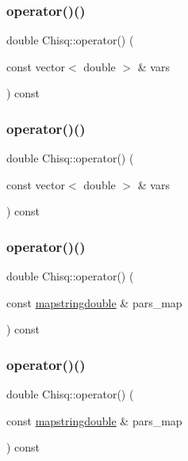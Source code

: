 \subsubsection{\texorpdfstring{operator()()}{operator()()}\hspace{0.1cm}{\footnotesize\ttfamily [1/4]}}
{\footnotesize\ttfamily double Chisq\+::operator() (\begin{DoxyParamCaption}\item[{const vector$<$ double $>$ \&}]{vars }\end{DoxyParamCaption}) const}

\mbox{\label{classChisq_a321122741639e94feeb3bff1eeadd1e7}} 
\subsubsection{\texorpdfstring{operator()()}{operator()()}\hspace{0.1cm}{\footnotesize\ttfamily [2/4]}}
{\footnotesize\ttfamily double Chisq\+::operator() (\begin{DoxyParamCaption}\item[{const vector$<$ double $>$ \&}]{vars }\end{DoxyParamCaption}) const}

\mbox{\label{classChisq_a32a21d511405fc53af969f0984abc54f}} 
\subsubsection{\texorpdfstring{operator()()}{operator()()}\hspace{0.1cm}{\footnotesize\ttfamily [3/4]}}
{\footnotesize\ttfamily double Chisq\+::operator() (\begin{DoxyParamCaption}\item[{const \mbox{\hyperlink{lib_2fitting__lib_2includes_8h_a647b481c557c7966517f753340a81d13}{mapstringdouble}} \&}]{pars\+\_\+map }\end{DoxyParamCaption}) const}

\mbox{\label{classChisq_a32a21d511405fc53af969f0984abc54f}} 
\subsubsection{\texorpdfstring{operator()()}{operator()()}\hspace{0.1cm}{\footnotesize\ttfamily [4/4]}}
{\footnotesize\ttfamily double Chisq\+::operator() (\begin{DoxyParamCaption}\item[{const \mbox{\hyperlink{lib_2fitting__lib_2includes_8h_a647b481c557c7966517f753340a81d13}{mapstringdouble}} \&}]{pars\+\_\+map }\end{DoxyParamCaption}) const}


